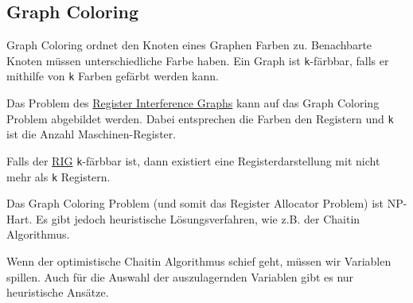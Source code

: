 \subsection{Graph Coloring}

Graph Coloring ordnet den Knoten eines Graphen Farben zu. Benachbarte Knoten
müssen unterschiedliche Farbe haben. Ein Graph ist \texttt{k}-färbbar, falls er
mithilfe von \texttt{k} Farben gefärbt werden kann.

Das Problem des \hyperref[subsec:rig]{Register Interference Graphs} kann auf das
Graph Coloring Problem abgebildet werden. Dabei entsprechen die Farben den
Registern und \texttt{k} ist die Anzahl Maschinen-Register.

Falls der \hyperref[subsec:rig]{RIG} \texttt{k}-färbbar ist, dann existiert eine
Registerdarstellung mit nicht mehr als \texttt{k} Registern.

Das Graph Coloring Problem (und somit das Register Allocator Problem) ist
NP-Hart. Es gibt jedoch heuristische Lösungsverfahren, wie z.B. der Chaitin
Algorithmus.

Wenn der optimistische Chaitin Algorithmus schief geht, müssen wir Variablen
spillen. Auch für die Auswahl der auszulagernden Variablen gibt es nur
heuristische Ansätze.
